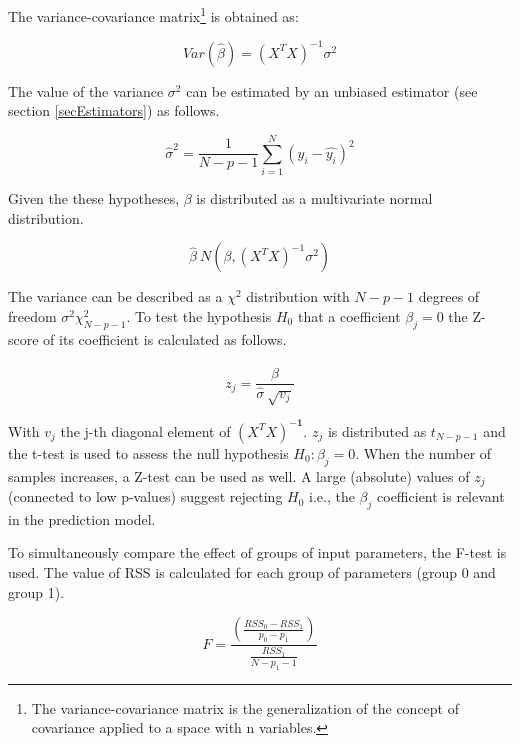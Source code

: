The variance-covariance matrix\footnote{The variance-covariance matrix is the generalization of the concept of covariance applied to a space with n variables.} is obtained as:

\begin{equation}
Var\left(\hat{\beta}\right)=\left(X^TX\right)^{-1}\sigma^2
\label{eq_OLSgeo5}
\end{equation}

The value of the variance $\sigma^2$ can be estimated by an unbiased estimator (see section \ref{secEstimators}) as follows.

\begin{equation}
{\hat{\sigma}}^2=\frac{1}{N-p-1}\sum_{i=1}^{N}\left(y_i-\widehat{y_i}\right)^2
\label{eq_OLSgeo6}
\end{equation}

Given the these hypotheses, $\beta$ is distributed as a multivariate normal distribution.

\begin{equation}
\hat{\beta}~N(\beta,\left(X^TX\right)^{-1}\sigma^2)
\label{eq_OLSgeo7}
\end{equation}

The variance can be described as a $\chi^2$ distribution with $N-p-1$ degrees of freedom $\sigma^2\chi_{N-p-1}^2$. To test the hypothesis $H_0$ that a coefficient $\beta_j=0$ the Z-score of its coefficient is calculated as follows.

\begin{equation}
z_j=\frac{\hat{\beta}}{\hat{\sigma}\ \sqrt{v_j}}
\label{eq_OLSgeo8}
\end{equation}

With $v_j$ the j-th diagonal element of $\left({X}^{T}{X}\right)^{-\mathbf{1}}$. $z_j$ is distributed as $t_{N-p-1}$ and the t-test is used to assess the null hypothesis $H_0:\beta_j = 0$. When the number of samples increases, a Z-test can be used as well. A large (absolute) values of $z_j$ (connected to low p-values) suggest rejecting $H_0$ i.e., the $\beta_j$ coefficient is relevant in the prediction model.\par

To simultaneously compare the effect of groups of input parameters, the F-test is used. The value of RSS is calculated for each group of parameters (group 0 and group 1).

\begin{equation}
F=\frac{\left(\frac{{RSS}_0-{RSS}_1}{p_0-p_1}\right)}{\frac{RSS_1}{N-p_1-1}}
\label{eq_OLSgeo9}
\end{equation}

